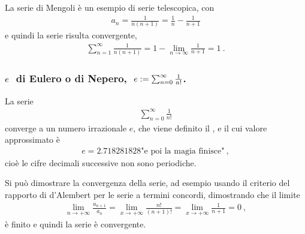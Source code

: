 \documentclass[letterpaper,10pt,english]{jupyterBook}
\begin{document}
\sphinxAtStartPar
La serie di Mengoli è un esempio di serie telescopica, con
\begin{equation*}
\begin{split}a_n = \frac{1}{n(n+1)} = \frac{1}{n} - \frac{1}{n+1}\end{split}
\end{equation*}
\sphinxAtStartPar
e quindi la serie risulta convergente,
\begin{equation*}
\begin{split}\sum_{n=1}^{\infty} \frac{1}{n(n+1)} = 1 - \lim_{n \rightarrow \infty} \frac{1}{n+1} = 1 \ .\end{split}
\end{equation*}\subsubsection*{\protect\(e\ \protect\) di Eulero o di Nepero, \protect\(\ e := \sum_{n=0}^{\infty} \frac{1}{n!}\protect\).}

\sphinxAtStartPar
La serie
\begin{equation*}
\begin{split}\sum_{n=0}^{\infty} \frac{1}{n!}\end{split}
\end{equation*}
\sphinxAtStartPar
converge a un numero irrazionale \(e\), che viene definito il , e il cui valore approssimato è
\begin{equation*}
\begin{split}e = 2.718281828\text{"e poi la magia finisce"} \ ,\end{split}
\end{equation*}
\sphinxAtStartPar
cioè le cifre decimali successive non sono periodiche.

\sphinxAtStartPar
Si può dimostrare la convergenza della serie, ad esempio usando il criterio del rapporto di d’Alembert per le serie a termini concordi, dimostrando che il limite
\begin{equation*}
\begin{split}\lim_{n \rightarrow +\infty} \frac{a_{n+1}}{a_n} = \lim_{x \rightarrow +\infty}\frac{n!}{(n+1)!} = \lim_{x \rightarrow +\infty} \frac{1}{n+1} = 0 \ ,\end{split}
\end{equation*}
\sphinxAtStartPar
è finito e quindi la serie è convergente.
\end{document}
